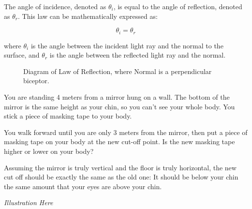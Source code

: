 \begin{mdframed}[style=important, frametitle={Law of Reflection}]
The angle of incidence, denoted as $\theta_i$, is equal to
the angle of reflection, denoted as $\theta_r$. This law can be
mathematically expressed as:

$$\theta_i = \theta_r$$
 
where $\theta_i$ is the angle between the incident light ray and the
normal to the surface, and $\theta_r$ is the angle between the
reflected light ray and the normal.


\begin{figure}[htbp]
    \centering
    \caption{Diagram of Law of Reflection, where Normal is a perpendicular biceptor.}
    \label{fig:tikzLawOfReflection}
\end{figure}

\end{mdframed}

\begin{Exercise}[title={Law of Reflection}, label=law_of_reflection]

  You are standing 4 meters from a mirror hung on a wall. The bottom
  of the mirror is the same height as your chin, so you can't see your
  whole body. You stick a piece of masking tape to your body.

  You walk forward until you are only 3 meters from the mirror, then
  put a piece of masking tape on your body at the new cut-off point. Is the new
  masking tape higher or lower on your body?
  
\end{Exercise}
\begin{Answer}[ref=law_of_reflection]

 Assuming the mirror is truly vertical and the floor is truly
 horizontal, the new cut off should be exactly the same as the old
 one: It should be below your chin the same amount that your eyes are
 above your chin.

 \textit{Illustration Here}

\end{Answer}

